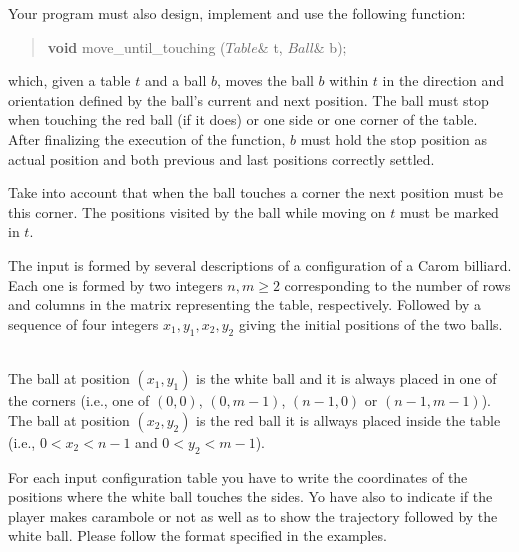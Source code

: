 Your program must also design, implement and use the following function:

\begin{quote}
 \textbf{void} move\_until\_touching ($Table$\& t, $Ball$\& b);

\end{quote}

which, given a table $t$ and a ball $b$,
moves the ball $b$ within $t$ in the direction and orientation defined by the ball's current and next position. The ball must stop when touching the red ball (if it does) or one side or one corner of the table.  After finalizing the execution  of the function, $b$ must hold the stop position as actual position and both previous and last positions correctly settled. 

Take into account that when the ball touches a corner the next position must be this corner. 
The positions visited by the ball while moving on $t$ must be marked in $t$. 



\Input

The input is formed by several descriptions of a configuration of a Carom billiard. Each one is formed by two integers  $n, m \geq 2$ corresponding to the number of rows and columns in the matrix representing the table, respectively.  Followed by a sequence of four integers  $x_1, y_1, x_2, y_2$ giving the initial positions of the two balls.

\ \\
The ball at position $(x_1, y_1)$ is the white ball and it is always placed in one of the corners (i.e., one of  $(0,0)$, 
$(0, m - 1)$, $(n - 1, 0)$ or $(n - 1, m - 1)$).  The ball at position $(x_2,y_2)$ is the red ball it is allways placed inside the table (i.e., $0<x_2<n-1$ and $0<y_2< m-1$).


\Output

For each input configuration table you have to write the coordinates of the positions where the white ball touches the sides. Yo have also to indicate if the player makes carambole or not as well as to show the trajectory followed by the white ball. Please follow the format specified in the examples.
\medskip



\Sample
